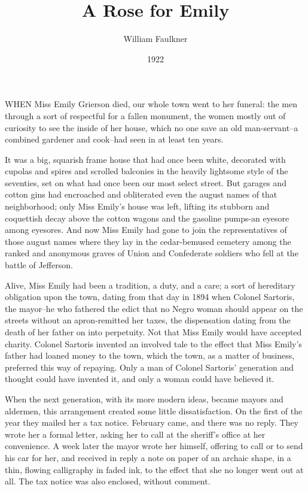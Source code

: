 \documentclass[10pt,a4paper]{article}
\newcommand{\glos}[3]{\dotuline{#1}\marginpar{\scriptsize\textit{#3} #2}}
\begin{document}
\title{A Rose for Emily}
\date{1922}
\author{William Faulkner}
\maketitle
    
\thispagestyle{plain}
\setcounter{page}{1}
\linenumbers
WHEN Miss Emily Grierson died, our whole town went to her funeral: the men through a sort of respectful \glos{affection}{hengivelse}{subs.} for a fallen monument, the women mostly out of curiosity to see the inside of her house, which no one save an old man-servant--a combined gardener and cook--had seen in at least ten years.

It was a big, squarish frame house that had once been white, decorated with cupolas and spires and scrolled balconies in the heavily lightsome style of the seventies, set on what had once been our most select street. But garages and cotton gins had encroached and obliterated even the august names of that neighborhood; only Miss Emily's house was left, lifting its stubborn and coquettish decay above the cotton wagons and the gasoline pumps-an eyesore among eyesores. And now Miss Emily had gone to join the representatives of those august names where they lay in the cedar-bemused cemetery among the ranked and anonymous graves of Union and Confederate soldiers who fell at the battle of Jefferson.

Alive, Miss Emily had been a tradition, a duty, and a care; a sort of hereditary obligation upon the town, dating from that day in 1894 when Colonel Sartoris, the mayor--he who fathered the edict that no Negro woman should appear on the streets without an apron-remitted her taxes, the dispensation dating from the death of her father on into perpetuity. Not that Miss Emily would have accepted charity. Colonel Sartoris invented an involved tale to the effect that Miss Emily's father had loaned money to the town, which the town, as a matter of business, preferred this way of repaying. Only a man of Colonel Sartoris' generation and thought could have invented it, and only a woman could have believed it.

When the next generation, with its more modern ideas, became mayors and aldermen, this arrangement created some little dissatisfaction. On the first of the year they mailed her a tax notice. February came, and there was no reply. They wrote her a formal letter, asking her to call at the sheriff's office at her convenience. A week later the mayor wrote her himself, offering to call or to send his car for her, and received in reply a note on paper of an archaic shape, in a thin, flowing calligraphy in faded ink, to the effect that she no longer went out at all. The tax notice was also enclosed, without comment.
\end{document}
